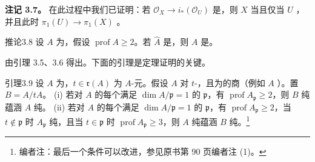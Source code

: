 \textbf{注记 3.7。} 在此过程中我们已证明：若 $\mathcal O_X\to i_*(\mathcal O_U)$ 是，则 $X$ 当且仅当 $U$ ，并且此时 $\pi_1(U)\to\pi_1(X)$ 。
\begin{SGAresult}{推论}{3.8}
设 $A$ 为，假设 $\operatorname{prof}A\geq2$。若 $\widehat A$ 是，则 $A$ 是。
\end{SGAresult}
由引理 3.5、3.6 得出。下面的引理是定理证明的关键。
\begin{SGAresult}{引理}{3.9}
设 $A$ 为，$t\in\mathfrak r(A)$ 为 $A$-元。假设 $A$ 对 $t$-，且为的商（例如 $A$ ）。置 $B=A/tA$。
(i) 若对 $A$ 的每个满足 $\dim A/\mathfrak p=1$ 的 $\mathfrak p$，有 $\operatorname{prof}A_{\mathfrak p}\geq2$，则 $B$ 纯蕴涵 $A$ 纯。
(ii) 若对 $A$ 的每个满足 $\dim A/\mathfrak p=1$ 的 $\mathfrak p$，有 $\operatorname{prof}A_{\mathfrak p}\geq2$，当 $t\notin\mathfrak p$ 时 $A_{\mathfrak p}$ 纯，且当 $t\in\mathfrak p$ 时 $\operatorname{prof}A_{\mathfrak p}\geq3$，则 $A$ 纯蕴涵 $B$ 纯。\footnote{编者注：最后一个条件可以改进，参见原书第 90 页编者注 (1)。}
\end{SGAresult}
